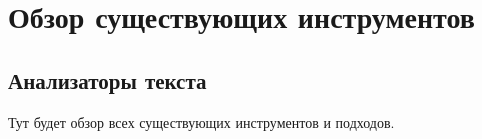 \chapter{Обзор существующих инструментов} \label{chapt1}

\section{Анализаторы текста} \label{sect1_1}

Тут будет обзор всех существующих инструментов и подходов.
